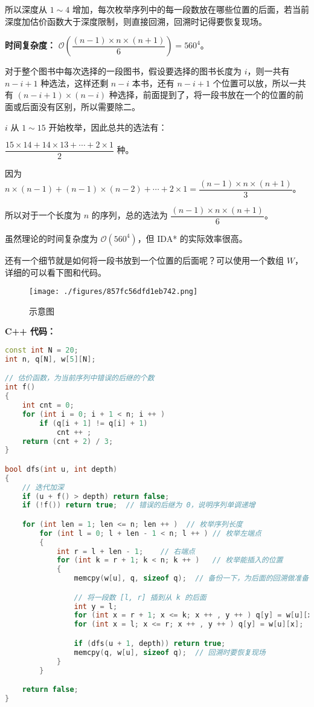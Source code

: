 所以深度从 $1 \sim 4$ 增加，每次枚举序列中的每一段数放在哪些位置的后面，若当前深度加估价函数大于深度限制，则直接回溯，回溯时记得要恢复现场。

\textbf{时间复杂度：} $\mathcal{O}(\dfrac{(n - 1) \times n \times (n + 1)}{6}) = 560^4$。

对于整个图书中每次选择的一段图书，假设要选择的图书长度为 $i$，则一共有 $n - i + 1$ 种选法，这样还剩 $n - i$ 本书，还有 $n - i + 1$ 个位置可以放，所以一共有 $(n - i + 1) \times (n - i)$ 种选择，前面提到了，将一段书放在一个的位置的前面或后面没有区别，所以需要除二。

$i$ 从 $1 \sim 15$ 开始枚举，因此总共的选法有：

$\dfrac{15 \times 14 + 14 \times 13 + \cdots + 2 \times 1}{2}$ 种。

因为 $n \times (n - 1) + (n - 1) \times (n - 2) + \cdots + 2 \times 1 = \dfrac{(n - 1) \times n \times (n + 1)}{3}$。

所以对于一个长度为 $n$ 的序列，总的选法为 $\dfrac{(n - 1) \times n \times (n + 1)}{6}$。

虽然理论的时间复杂度为 $\mathcal{O}(560^4)$，但 IDA* 的实际效率很高。

还有一个细节就是如何将一段书放到一个位置的后面呢？可以使用一个数组 $W$，详细的可以看下图和代码。

\begin{figure}[ht]
\centering
\texttt{[image: ./figures/857fc56dfd1eb742.png]}
\caption{示意图} \label{fig_IDAs_1}
\end{figure}

\textbf{C++ 代码：}

\begin{lstlisting}[language=cpp]
const int N = 20;
int n, q[N], w[5][N];

// 估价函数，为当前序列中错误的后继的个数
int f()
{
    int cnt = 0;
    for (int i = 0; i + 1 < n; i ++ )
        if (q[i + 1] != q[i] + 1)
            cnt ++ ;
    return (cnt + 2) / 3;
}

bool dfs(int u, int depth)
{
    // 迭代加深
    if (u + f() > depth) return false;
    if (!f()) return true;  // 错误的后继为 0，说明序列单调递增

    for (int len = 1; len <= n; len ++ )  // 枚举序列长度
        for (int l = 0; l + len - 1 < n; l ++ ) // 枚举左端点
        {
            int r = l + len - 1;    // 右端点
            for (int k = r + 1; k < n; k ++ )   // 枚举能插入的位置
            {
                memcpy(w[u], q, sizeof q);  // 备份一下，为后面的回溯做准备

                // 将一段数 [l, r] 插到从 k 的后面
                int y = l;  
                for (int x = r + 1; x <= k; x ++ , y ++ ) q[y] = w[u][x];
                for (int x = l; x <= r; x ++ , y ++ ) q[y] = w[u][x];

                if (dfs(u + 1, depth)) return true;
                memcpy(q, w[u], sizeof q);  // 回溯时要恢复现场
            }
        }

    return false;
}
\end{lstlisting}

